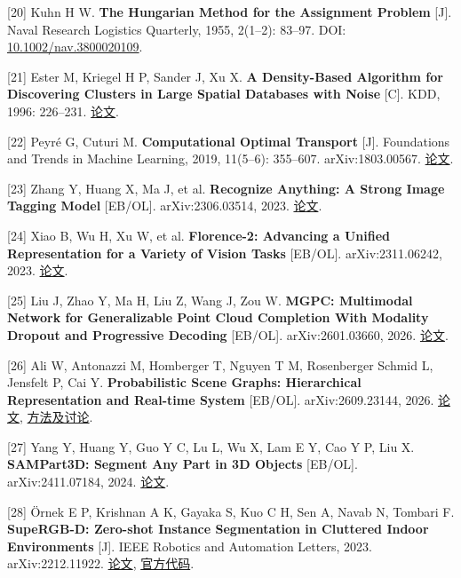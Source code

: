 \documentclass[UTF8,fontset=fandol]{ctexart}
\begin{document}
[20] Kuhn H W. \textbf{The Hungarian Method for the Assignment Problem} [J]. Naval Research Logistics Quarterly, 1955, 2(1–2): 83–97. DOI: \href{https://doi.org/10.1002/nav.3800020109}{10.1002/nav.3800020109}.



[21] Ester M, Kriegel H P, Sander J, Xu X. \textbf{A Density-Based Algorithm for Discovering Clusters in Large Spatial Databases with Noise} [C]. KDD, 1996: 226–231. \href{https://www2.cs.sfu.ca/\textasciitilde{}ester/papers/kdd-96.pdf}{论文}.



[22] Peyré G, Cuturi M. \textbf{Computational Optimal Transport} [J]. Foundations and Trends in Machine Learning, 2019, 11(5–6): 355–607. arXiv:1803.00567. \href{https://arxiv.org/abs/1803.00567}{论文}.



[23] Zhang Y, Huang X, Ma J, et al. \textbf{Recognize Anything: A Strong Image Tagging Model} [EB/OL]. arXiv:2306.03514, 2023. \href{https://arxiv.org/abs/2306.03514}{论文}.



[24] Xiao B, Wu H, Xu W, et al. \textbf{Florence-2: Advancing a Unified Representation for a Variety of Vision Tasks} [EB/OL]. arXiv:2311.06242, 2023. \href{https://arxiv.org/abs/2311.06242}{论文}.



[25] Liu J, Zhao Y, Ma H, Liu Z, Wang J, Zou W. \textbf{MGPC: Multimodal Network for Generalizable Point Cloud Completion With Modality Dropout and Progressive Decoding} [EB/OL]. arXiv:2601.03660, 2026. \href{https://arxiv.org/abs/2601.03660}{论文}.



[26] Ali W, Antonazzi M, Homberger T, Nguyen T M, Rosenberger Schmid L, Jensfelt P, Cai Y. \textbf{Probabilistic Scene Graphs: Hierarchical Representation and Real-time System} [EB/OL]. arXiv:2609.23144, 2026. \href{https://arxiv.org/abs/2609.23144}{论文}, \href{https://arxiv.org/html/2609.23144v1}{方法及讨论}.



[27] Yang Y, Huang Y, Guo Y C, Lu L, Wu X, Lam E Y, Cao Y P, Liu X. \textbf{SAMPart3D: Segment Any Part in 3D Objects} [EB/OL]. arXiv:2411.07184, 2024. \href{https://arxiv.org/abs/2411.07184}{论文}.



[28] Örnek E P, Krishnan A K, Gayaka S, Kuo C H, Sen A, Navab N, Tombari F. \textbf{SupeRGB-D: Zero-shot Instance Segmentation in Cluttered Indoor Environments} [J]. IEEE Robotics and Automation Letters, 2023. arXiv:2212.11922. \href{https://arxiv.org/abs/2212.11922}{论文}, \href{https://github.com/evinpinar/supergb-d}{官方代码}.
\end{document}
